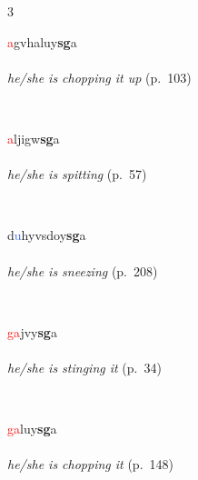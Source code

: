 \documentclass[oneside,openany]{book}%
\begin{document}
\noindent\begin{multicols}{3}%
\begin{minipage}[t]{\linewidth}
\raggedright\noindent \textcolor{Red}{a}gvhaluy\textbf{sg}a\\
\\
\noindent \textit{he/she is chopping it up} (p.~103)
\end{minipage}\\[1em]%
\begin{minipage}[t]{\linewidth}
\raggedright\noindent \textcolor{Red}{a}ljigw\textbf{sg}a\\
\\
\noindent \textit{he/she is spitting} (p.~57)
\end{minipage}\\[1em]%
\begin{minipage}[t]{\linewidth}
\raggedright\noindent d\textcolor{RoyalBlue}{u}hyvsdoy\textbf{sg}a\\
\\
\noindent \textit{he/she is sneezing} (p.~208)
\end{minipage}\\[1em]%
\begin{minipage}[t]{\linewidth}
\raggedright\noindent \textcolor{Red}{ga}jvy\textbf{sg}a\\
\\
\noindent \textit{he/she is stinging it} (p.~34)
\end{minipage}\\[1em]%
\begin{minipage}[t]{\linewidth}
\raggedright\noindent \textcolor{Red}{ga}luy\textbf{sg}a\\
\\
\noindent \textit{he/she is chopping it} (p.~148)
\end{minipage}\\[1em]%
\end{multicols}%
\vspace{1em}%
\needspace{1.5in}%
\end{document}
